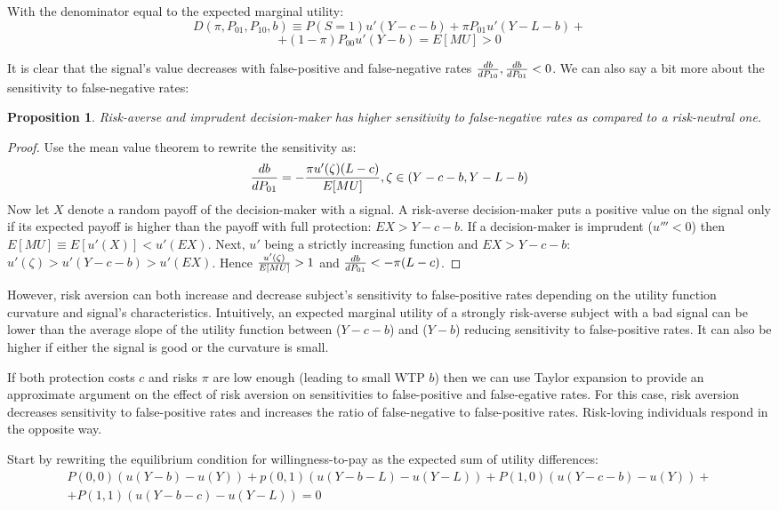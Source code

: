 \documentclass[12pt,a4paper]{article}
\newtheorem{theorem}{Proposition}
\begin{document}
With the denominator equal to the expected marginal utility:
$$D(\pi, P_{01}, P_{10}, b)\equiv P(S=1)u'(Y-c-b)+\pi P_{01}u'(Y-L-b)+$$
$$+(1-\pi)P_{00}u'(Y-b)=E[MU]>0$$

It is clear that the signal's value decreases with false-positive and false-negative rates ${db\over dP_{10}},{db\over dP_{01}}<0$. We can also say a bit more about the sensitivity to false-negative rates:
\begin{theorem}
Risk-averse and imprudent decision-maker has higher sensitivity to false-negative rates as compared to a risk-neutral one.
\end{theorem}\label{thm:riskAverse}  \small
\begin{proof}
Use the mean value theorem to rewrite the sensitivity as:
$${db\over dP_{01}}=-{\pi u'(\zeta)(L-c)\over E[MU]},\zeta \in \left(Y-c-b, Y-L-b\right)$$
Now let $X$ denote a random payoff of the decision-maker with a signal. A risk-averse decision-maker puts a positive value on the signal only if its expected payoff is higher than the payoff with full protection: $EX>Y-c-b$. If a decision-maker is imprudent ($u'''<0$) then $E[MU]\equiv E[u'(X)]<u'(EX)$. Next, $u'$ being a strictly increasing function and $EX>Y-c-b$: $u'(\zeta)>u'(Y-c-b)>u'(EX)$. Hence ${u'(\zeta)\over E[MU]}>1$ and ${db\over dP_{01}}<-\pi(L-c)$. 
\end{proof}
\normalsize

However, risk aversion can both increase and decrease subject's sensitivity to false-positive rates depending on the utility function curvature and signal's characteristics. Intuitively, an expected marginal utility of a strongly risk-averse subject with a bad signal can be lower than the average slope of the utility function between ($Y-c-b$) and ($Y-b$) reducing sensitivity to false-positive rates. It can also be higher if either the signal is good or the curvature is small. 

If both protection costs $c$ and risks $\pi$ are low enough (leading to small WTP $b$) then we can use Taylor expansion to provide an approximate argument on the effect of risk aversion on sensitivities to false-positive and false-egative rates. For this case, risk aversion decreases sensitivity to false-positive rates and increases the ratio of false-negative to false-positive rates. Risk-loving individuals respond in the opposite way.

\small
Start by rewriting the equilibrium condition for willingness-to-pay as the expected sum of utility differences:
\begin{equation}
\begin{split}
P(0,0) (u(Y-b)-u(Y))+p(0,1)(u(Y-b-L)-u(Y-L))+P(1,0)(u(Y-c-b)-u(Y))+\\+P(1,1)(u(Y-b-c)-u(Y-L))=0
\end{split}
\end{equation}
\end{document}
